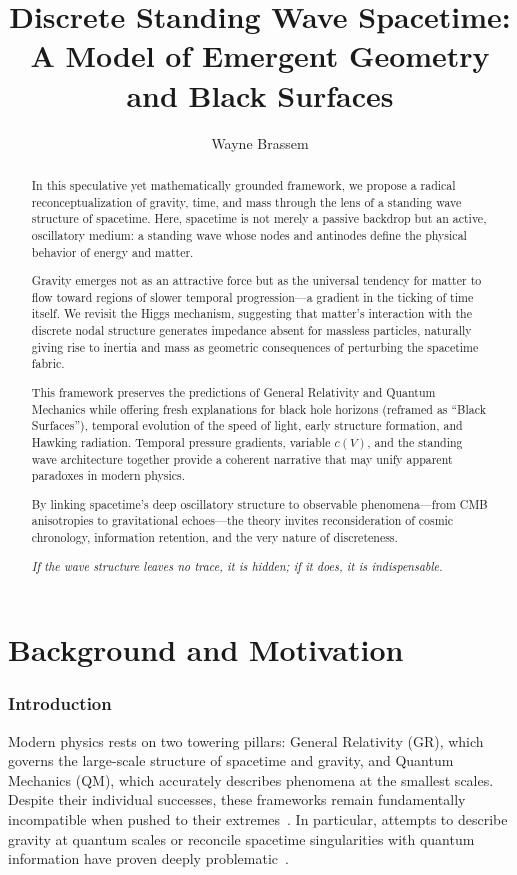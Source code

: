 \documentclass[12pt]{article}
\title{Discrete Standing Wave Spacetime: A Model of Emergent Geometry and Black Surfaces}
\author{Wayne Brassem}
\begin{document}
\maketitle

\begin{abstract}
In this speculative yet mathematically grounded framework, we propose a radical reconceptualization of gravity, time, and mass through the lens of a standing wave structure of spacetime. Here, spacetime is not merely a passive backdrop but an active, oscillatory medium: a standing wave whose nodes and antinodes define the physical behavior of energy and matter.

Gravity emerges not as an attractive force but as the universal tendency for matter to flow toward regions of slower temporal progression---a gradient in the ticking of time itself. We revisit the Higgs mechanism, suggesting that matter’s interaction with the discrete nodal structure generates impedance absent for massless particles, naturally giving rise to inertia and mass as geometric consequences of perturbing the spacetime fabric.

This framework preserves the predictions of General Relativity and Quantum Mechanics while offering fresh explanations for black hole horizons (reframed as “Black Surfaces”), temporal evolution of the speed of light, early structure formation, and Hawking radiation. Temporal pressure gradients, variable $c(V)$, and the standing wave architecture together provide a coherent narrative that may unify apparent paradoxes in modern physics.

By linking spacetime’s deep oscillatory structure to observable phenomena---from CMB anisotropies to gravitational echoes---the theory invites reconsideration of cosmic chronology, information retention, and the very nature of discreteness.

\vspace{1em}

\textit{If the wave structure leaves no trace, it is hidden; if it does, it is indispensable.}
\end{abstract}

\newpage


\tableofcontents

\cleardoublepage
\part{Background and Motivation}

\section{Introduction}
Modern physics rests on two towering pillars: General Relativity (GR), which governs the large-scale structure of spacetime and gravity, and Quantum Mechanics (QM), which accurately describes phenomena at the smallest scales. Despite their individual successes, these frameworks remain fundamentally incompatible when pushed to their extremes~\cite{waldGR1984}. In particular, attempts to describe gravity at quantum scales or reconcile spacetime singularities with quantum information have proven deeply problematic~\cite{einstein1915, hawking1976}.
\end{document}

